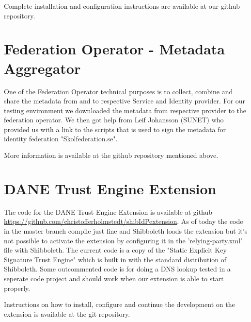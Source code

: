 Complete installation and configuration instructions are available at our github repository.

\section{Federation Operator - Metadata Aggregator}
One of the Federation Operator technical purposes is to collect, combine and share the metadata from and to respective Service and Identity provider.
For our testing environment we downloaded the metadata from respective provider to the federation operator.
We then got help from Leif Johansson (SUNET) who provided us with a link to the scripts that is used to sign the metadata for identity federation "Skolfederation.se".

More information is available at the github repository mentioned above.

\section{DANE Trust Engine Extension}
The code for the DANE Trust Engine Extension is available at github \url{https://github.com/christofferholmstedt/shibIdPextension}.
As of today the code in the master branch compile just fine and Shibboleth loads the extension but it's not possible to activate the extension by configuring it in the 'relying-party.xml' file with Shibboleth.
The current code is a copy of the "Static Explicit Key Signature Trust Engine" which is built in with the standard distribution of Shibboleth.
Some outcommented code is for doing a DNS lookup tested in a seperate code project and should work when our extension is able to start properly.

Instructions on how to install, configure and continue the development on the extension is available at the git repository. 

